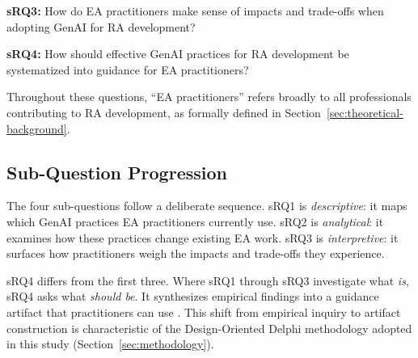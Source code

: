 \vspace{0.5em}
\noindent\textbf{sRQ3:} How do EA practitioners make sense of impacts and trade-offs when adopting GenAI for RA development?

\vspace{0.5em}
\noindent\textbf{sRQ4:} How should effective GenAI practices for RA development be systematized into guidance for EA practitioners?

\vspace{0.5em}
\noindent Throughout these questions, ``EA practitioners'' refers broadly to all
professionals contributing to RA development, as formally defined in
Section~\ref{sec:theoretical-background}.

\subsection{Sub-Question Progression}

The four sub-questions follow a deliberate sequence. sRQ1 is
\emph{descriptive}: it maps which GenAI practices EA practitioners currently
use. sRQ2 is \emph{analytical}: it examines how these practices change existing
EA work. sRQ3 is \emph{interpretive}: it surfaces how practitioners weigh the
impacts and trade-offs they experience.

sRQ4 differs from the first three. Where sRQ1 through sRQ3 investigate what
\emph{is}, sRQ4 asks what \emph{should be}. It synthesizes empirical findings
into a guidance artifact that practitioners can use
\parencite{gregor_positioning_2013}. This shift from empirical inquiry to
artifact construction is characteristic of the Design-Oriented Delphi
methodology adopted in this study (Section~\ref{sec:methodology}).
